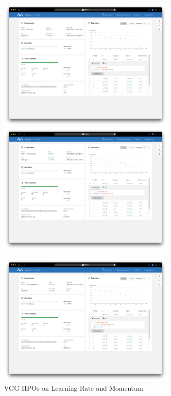 \documentclass{article}
\begin{document}
\begin{figure}
	\centerline{\includegraphics[width=3.5in]{../proj3/figures/vgg_tpe_overview.png}\includegraphics[width=3.5in]{../proj3/figures/vgg_evolution_overview.png}}
	\centerline{\includegraphics[width=3.5in]{../proj3/figures/vgg_hyperband_overview.png}}
	\caption{VGG HPOs on Learning Rate and Momentum}
	\label{fig:vgg-all}
\end{figure}
\end{document}
